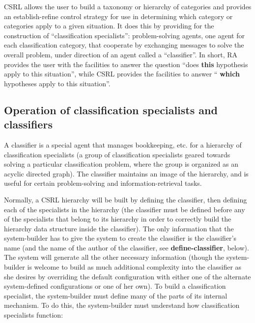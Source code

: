 CSRL allows the user to build a taxonomy or hierarchy of categories
and provides an establish-refine control strategy for use in
determining which category or categories apply to a given situation.
It does this by providing for the construction of ``classification
specialists'': problem-solving agents, one agent for each
classification category, that cooperate by exchanging messages to
solve the overall problem, under direction of an agent called a
``classifier''. In short, RA provides the user with the facilities to
answer the question ``does {\bf this} hypothesis apply to this
situation'', while CSRL provides the facilities to answer ``{\bf
which} hypotheses apply to this situation''.



\subsection{Operation of classification specialists and classifiers}

A classifier is a special agent that manages bookkeeping, etc. for a
hierarchy of classification specialists (a group of classification
specialists geared towards solving a particular classification
problem, where the group is organized as an acyclic directed graph).
The classifier maintains an image of the hierarchy, and is useful
for certain problem-solving and information-retrieval tasks.

Normally, a CSRL hierarchy will be built by defining the classifier,
then defining each of the specialists in the hierarchy (the classifier
must be defined before any of the specialists that belong to its
hierarchy in order to correctly build the hierarchy data structure
inside the classifier). The only information that the system-builder
has to give the system to create the classifier is the classifier's
name (and the name of the author of the classifier, see {\bf
define-classifier}, below). The system will generate all the other
necessary information (though the system-builder is welcome to build
as much additional complexity into the classifier as she desires by
overriding the default configuration with either one of the alternate
system-defined configurations or one of her own).  To build a
classification specialist, the system-builder must define many of the
parts of its internal mechanism. To do this, the system-builder must
understand how classification specialists function:

